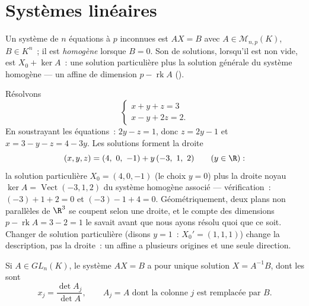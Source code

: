 \section{Systèmes linéaires}

\begin{definition}\label{def:b1:det:system}
Un système  de $n$ équations à $p$
inconnues est $AX = B$ avec $A \in \mathcal{M}_{n,p}(K)$, $B \in
K^n$~; il est \emph{homogène} lorsque $B = 0$. Son  de
solutions, lorsqu'il est non vide, est $X_0 + \ker A$~: une solution
particulière plus la solution générale du système homogène --- un
 affine de dimension $p - \operatorname{rk} A$ ().
\end{definition}

\begin{example}
\label{ex:b1:det:affinestructure}
Résolvons
\[
\begin{cases}
x + y + z = 3\\
x - y + 2z = 2 .
\end{cases}
\]
En soustrayant les équations~: $2y - z = 1$, donc $z = 2y - 1$ et $x =
3 - y - z = 4 - 3y$. Les solutions forment la droite
\[
(x, y, z) = (4,\ 0,\ -1) + y\,(-3,\ 1,\ 2)
\qquad (y \in \R):
\]
la solution particulière $X_0 = (4, 0, -1)$ (le choix $y = 0$) plus la
droite noyau $\ker A = \operatorname{Vect}(-3, 1, 2)$ du système
homogène associé --- vérification~: $(-3) + 1 + 2 = 0$ et
$(-3) - 1 + 4 = 0$. Géométriquement, deux plans non parallèles de
$\R^3$ se coupent selon une droite, et le compte des dimensions $p -
\operatorname{rk} A = 3 - 2 = 1$ le savait avant que nous ayons résolu
quoi que ce soit. Changer de solution particulière (disons $y = 1$~:
$X_0' = (1, 1, 1)$) change la description, pas la droite~: un
 affine a plusieurs origines et une seule direction.
\end{example}

\begin{theorem}\label{thm:b1:det:cramer}
Si $A \in GL_n(K)$, le système $AX = B$ a pour unique solution $X =
A^{-1}B$, dont les  sont
\[
x_j = \frac{\det A_j}{\det A},
\qquad A_j = A \text{ dont la colonne } j \text{ est remplacée par } B .
\]
\end{theorem}

